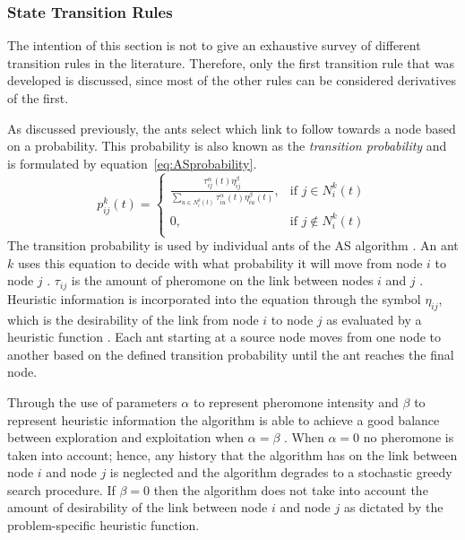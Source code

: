 \subsubsection{State Transition Rules}
\label{sec:STR}
The intention of this section is not to give an exhaustive survey of different transition rules in the literature. Therefore, only the first transition rule that was developed is discussed, since most of the other rules can be considered derivatives of the first. 

 As discussed previously, the ants select which link to follow towards a node based on a probability. This probability is also known as the \emph{transition probability} and is formulated by equation~\ref{eq:ASprobability}.
\begin{equation}
\label{eq:ASprobability}
p^k_{ij}(t) =
\begin{cases}
	\frac{\tau^{\alpha}_{ij}(t)\eta^{\beta}_{ij}}{\sum_{u \in N^k_i(t)} {\tau^{\alpha}_{iu}(t)\eta^{\beta}_{iu}(t)}}, &\text{if $j \in N^k_i(t)$}\\
	0, &\text{if $j \notin N^k_i(t)$}\\
\end{cases}
\end{equation}
The transition probability is used by individual ants of the \gls{AS} algorithm \cite{AntQAP,FundamentalSwarm}. An ant $k$ uses this equation to decide with what probability it will move from node $i$ to node $j$ \cite{CompuIntelligenceIntro,ACOLargeProblem}. $\tau_{ij}$ is the amount of pheromone on the link between nodes $i$ and $j$ \cite{AntsAndStigmergy,ACOLargeProblem}. Heuristic information is incorporated into the equation through the symbol $\eta_{ij}$, which is the desirability of the link from node $i$ to node $j$ as evaluated by a heuristic function \cite{AntsAndStigmergy,ACOLargeProblem}. 
Each ant starting at a source node moves from one node to another based on the defined transition probability until the ant reaches the final node.

Through the use of parameters $\alpha$ to represent pheromone intensity and $\beta$ to represent heuristic information the algorithm is able to achieve a good balance between exploration and exploitation when $\alpha=\beta$ \cite{ACOLargeProblem,AntQAP}. When $\alpha = 0$ no pheromone is taken into account; hence, any history that the algorithm has on the link between node $i$ and node $j$ is neglected and the algorithm degrades to a stochastic greedy search procedure. If $\beta = 0$ then the algorithm does not take into account the amount of desirability of the link between node $i$ and node $j$ as dictated by the problem-specific heuristic function.

